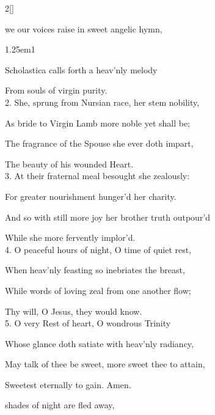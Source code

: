 \begin{paracol}{2}[]
\vspace{-1\baselineskip}

\mattins
{}

\mattinsInvitatoryHymn\label{ScholasticaInvitatory}

 we our voices raise in sweet angelic hymn,


\begin{hangparas}{1.25em}{1}

Scholastica calls forth a heav'nly melody

From souls of virgin purity.\\

2. She, sprung from Nursian race, her stem nobility,

As bride to Virgin Lamb more noble yet shall be;

The fragrance of the Spouse she ever doth impart,

The beauty of his wounded Heart.\\

3. At their fraternal meal besought she zealously:

For greater nourishment hunger'd her charity.

And so with still more joy her brother truth outpour'd

While she more fervently implor'd.\\

4. O peaceful hours of night, O time of quiet rest,

When heav'nly feasting so inebriates the breast,

While words of loving zeal from one another flow;

Thy will, O Jesus, they would know.\\

5. O very Rest of heart, O wondrous Trinity

Whose glance doth satiate with heav'nly radiancy,

May talk of thee be sweet, more sweet thee to attain,

Sweetest eternally to gain. Amen.
\end{hangparas}

\mattinsOfficeHymn\label{ScholasticaMattins}

 shades of night are fled away,


\end{paracol}
